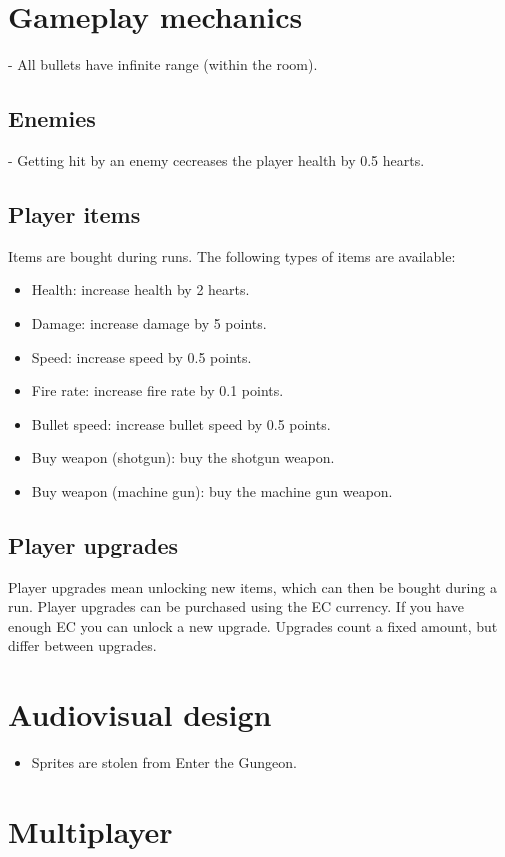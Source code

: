 \documentclass{article}
\begin{document}
\section{Gameplay mechanics}
- All bullets have infinite range (within the room).
\subsection{Enemies}
- Getting hit by an enemy cecreases the player health by 0.5 hearts.
\subsection{Player items}
Items are bought during runs. The following types of items are available:
\begin{itemize}
    \item Health: increase health by 2 hearts.
    \item Damage: increase damage by 5 points.
    \item Speed: increase speed by 0.5 points.
    \item Fire rate: increase fire rate by 0.1 points.
    \item Bullet speed: increase bullet speed by 0.5 points.
    \item Buy weapon (shotgun): buy the shotgun weapon.
    \item Buy weapon (machine gun): buy the machine gun weapon.
\end{itemize}
\subsection{Player upgrades}
Player upgrades mean unlocking new items, which can then be bought during a run.
Player upgrades can be purchased using the EC currency. If you have enough EC you can unlock a new upgrade.
Upgrades count a fixed amount, but differ between upgrades.

\section{Audiovisual design}
\begin{itemize}
    \item Sprites are stolen from Enter the Gungeon.
\end{itemize}

\section{Multiplayer}
\end{document}

